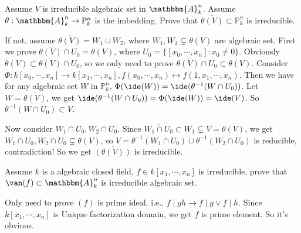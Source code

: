 \documentclass{ctexart}
\newif\ifpreface
\begin{document}
\large
\setlength{\baselineskip}{1.2em}
\ifpreface
	
	\newgeometry{left=2cm,right=2cm,top=2cm,bottom=2cm}
\else
	\maketitle
\fi
\begin{problem}
Assume \(V\) is irreducible algebraic set in \(\mathbbm{A}_k^{n}\).
Assume \(\theta:\mathbbm{A}_k^{n} \to \mathbb{P}_k^{n}\) is the imbedding.
Prove that \(\overline{\theta(V)} \subset \mathbb{P}_k^{n}\) is irreducible.
\end{problem}

\begin{solution}
  If not, assume \(\overline{\theta(V)}= W_1 \cup W_2\), where \(W_1,W_2 \subsetneq \theta(V)\) are algebraic set. 
  First we prove \(\overline{\theta(V)} \cap U_0=\theta(V)\), where \(U_0=\{[x_0,\cdots,x_n]:x_0 \neq 0\}\). 
  Obviously \(\theta(V)\subset \overline{\theta(V)} \cap U_0\), so we only need to prove \(\overline{\theta(V)} \cap U_0 \subset \theta(V)\). 
  Consider \(\Phi:k[x_0,\cdots,x_n] \to k[x_1,\cdots,x_n],f(x_0,\cdots,x_n)\mapsto f(1,x_1,\cdots,x_n)\). 
  Then we have for any algebraic set \(W\) in \(\mathbb{P}_k^n\), \(\Phi(\ide(W))=\ide(\theta^{-1}(W\cap U_0))\). 
  Let \(W=\overline{\theta(V)}\), we get \(\ide(\theta^{-1}(W \cap U_0))=\Phi(\ide(W))=\ide(V)\). 
  So \(\theta^{-1}(W \cap U_0) \subset V\). 

  Now consider \(W_1 \cap U_0,W_2 \cap U_0\). Since \(\overline{W_1 \cap U_0}\subset W_1 \subsetneq V=\overline{\theta(V)}\), 
  we get \(W_1 \cap U_0,W_2 \cap U_0 \subsetneq \theta(V)\), so \(V=\theta^{-1}(W_1 \cap U_0) \cup \theta^{-1}(W_2 \cap U_0)\) is reducible, contradiction! 
  So we get \(\overline{(\theta(V))}\) is irreducible. 
\end{solution}
\begin{problem}
  Assume \(k\) is a algebraic closed field, \(f \in k[x_1,\cdots,x_n]\) is irreducible, prove that \(\van(f)\subset \mathbbm{A}_k^{n}\) is irreducible algebraic set. 
\end{problem}
\begin{solution}
  Only need to prove \((f)\) is prime ideal. i.e., \(f \mid gh \to f \mid g \vee f \mid h\). 
  Since \(k[x_1,\cdots,x_n]\) is Unique factorization domain, we get \(f\) is prime element. 
  So it's obvious. 
\end{solution}
\end{document}
